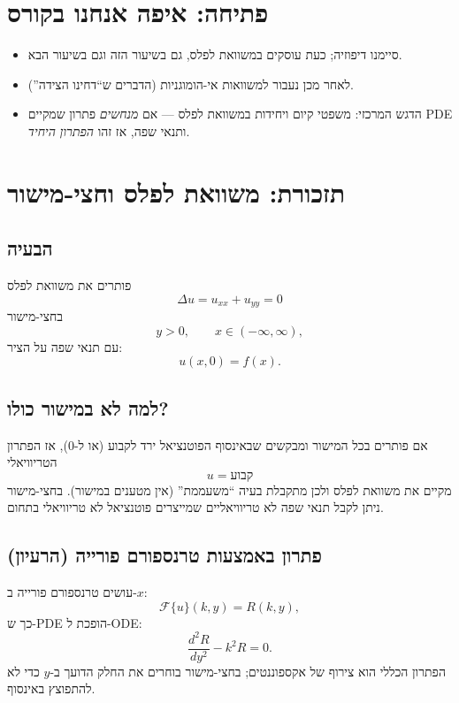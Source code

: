 \section*{פתיחה: איפה אנחנו בקורס}
\begin{itemize}
  \item סיימנו דיפוזיה; כעת עוסקים במשוואת לפלס, גם בשיעור הזה וגם בשיעור הבא.
  \item לאחר מכן נעבור למשוואות אי-הומוגניות (הדברים ש``דחינו הצידה'').
  \item הדגש המרכזי: משפטי קיום ויחידות במשוואת לפלס --- אם \emph{מנחשים} פתרון שמקיים PDE ותנאי שפה, אז זהו \emph{הפתרון היחיד}.
\end{itemize}

\section{תזכורת: משוואת לפלס וחצי-מישור}
\subsection{הבעיה}
פותרים את משוואת לפלס
\begin{equation}
\Delta u = u_{xx}+u_{yy}=0
\end{equation}
בחצי-מישור
\[
y>0,\qquad x\in(-\infty,\infty),
\]
עם תנאי שפה על הציר:
\begin{equation}
u(x,0)=f(x).
\end{equation}

\subsection{למה לא במישור כולו?}
אם פותרים בכל המישור ומבקשים שבאינסוף הפוטנציאל ירד לקבוע (או ל-$0$), אז הפתרון הטריוויאלי
\[
u=\text{קבוע}
\]
מקיים את משוואת לפלס ולכן מתקבלת בעיה ``משעממת'' (אין מטענים במישור). בחצי-מישור ניתן לקבל תנאי שפה לא טריוויאליים שמייצרים פוטנציאל לא טריוויאלי בתחום.

\subsection{פתרון באמצעות טרנספורם פורייה (הרעיון)}
עושים טרנספורם פורייה ב-$x$:
\[
\mathcal{F}\{u\}(k,y)=R(k,y),
\]
כך ש-PDE הופכת ל-ODE:
\begin{equation}
\frac{d^2 R}{dy^2}-k^2 R=0.
\end{equation}
הפתרון הכללי הוא צירוף של אקספוננטים; בחצי-מישור בוחרים את החלק הדועך ב-$y$ כדי לא להתפוצץ באינסוף.


